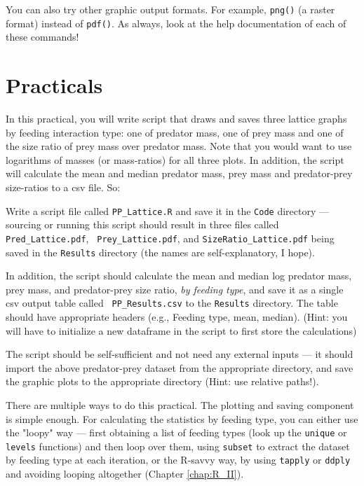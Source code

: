 You can also try other graphic output formats. For example, {\tt png()} 
(a raster format) instead of {\tt pdf()}. As always, look at the help 
documentation of each of these commands! 

\section{Practicals}
In this practical, you will write script that draws and saves three 
lattice graphs by feeding interaction type: one of predator mass, one 
of prey mass and one of the size ratio of prey mass over predator mass. 
Note that you would want to use logarithms of masses (or mass-ratios) 
for all three plots. In addition, the script will calculate the mean 
and median predator mass, prey mass and predator-prey size-ratios to a 
csv file. So:

\begin{compactitem}[$\quad\star$]
	
	\item Write a script file called {\tt PP\_Lattice.R} and save it in 
	the {\tt Code} directory --- sourcing or running this script should 
	result in three files called {\tt Pred\_Lattice.pdf}, {\tt 
	Prey\_Lattice.pdf}, and {\tt SizeRatio\_Lattice.pdf} being saved in 
	the {\tt Results} directory (the names are self-explanatory, I 
	hope).
    
	\item In addition, the script should calculate the mean and median 
	log predator mass, prey mass, and predator-prey size ratio, {\it by 
	feeding type}, and save it as a single csv output table called	{\tt 
	PP\_Results.csv} to the {\tt Results} directory. The table should 
	have appropriate headers (e.g., Feeding type, mean, median). (Hint: 
	you will have to initialize a new dataframe in the script to first 
	store the calculations) 

	\item The script should be self-sufficient and not need any 
	external inputs --- it should import the above predator-prey 
	dataset from the appropriate directory, and save the graphic plots 
	to the appropriate directory (Hint: use relative paths!).
	
	\item There are multiple ways to do this practical. The plotting and 
	saving component is simple enough. For calculating the statistics by 
	feeding type, you can either use the "loopy" way --- first obtaining 
	a list of feeding types (look up the {\tt unique} or {\tt levels} 
	functions) and then loop over them, using {\tt subset} to extract the 
	dataset by feeding type at each iteration, or the R-savvy way, by 
	using {\tt tapply} or {\tt ddply} and avoiding looping altogether 
	(Chapter \ref{chap:R_II}).
	
\end{compactitem}

